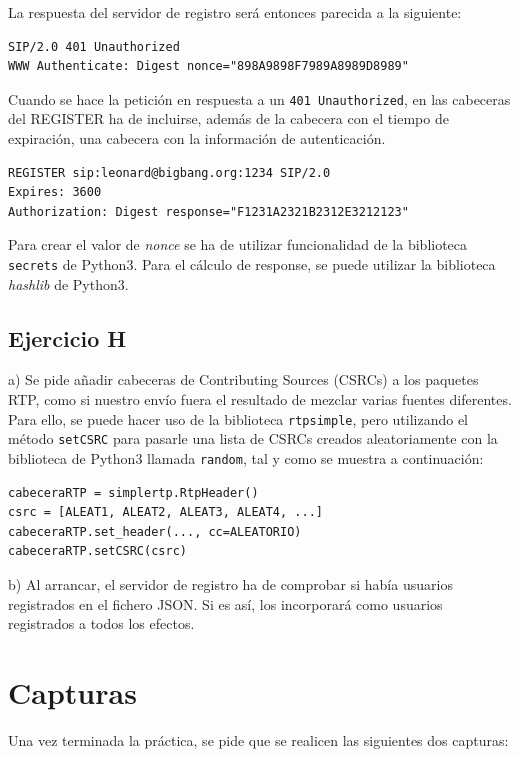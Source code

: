 \documentclass[a4paper,11pt]{article}
\begin{document}
La respuesta del servidor de registro será entonces parecida a la siguiente:
    
\begin{verbatim}
SIP/2.0 401 Unauthorized
WWW Authenticate: Digest nonce="898A9898F7989A8989D8989"
\end{verbatim}

Cuando se hace la petición en respuesta a un \texttt{401 Unauthorized}, en las cabeceras del REGISTER ha de incluirse, además de la cabecera con el tiempo de expiración, una cabecera con la información de autenticación.

\begin{verbatim}
REGISTER sip:leonard@bigbang.org:1234 SIP/2.0
Expires: 3600
Authorization: Digest response="F1231A2321B2312E3212123"
\end{verbatim}

Para crear el valor de \emph{nonce} se ha de utilizar funcionalidad de la biblioteca \texttt{secrets} de Python3. Para el cálculo de response, se puede utilizar la biblioteca \emph{hashlib} de Python3.


\subsection{Ejercicio H}

a) Se pide añadir cabeceras de Contributing Sources (CSRCs) a los paquetes RTP, como si nuestro envío fuera el resultado de mezclar varias fuentes diferentes. Para ello, se puede hacer uso de la biblioteca \texttt{rtpsimple}, pero utilizando el método \texttt{setCSRC} para pasarle una lista de CSRCs creados aleatoriamente con la biblioteca de Python3 llamada \texttt{random}, tal y como se muestra a continuación:

\begin{verbatim}
cabeceraRTP = simplertp.RtpHeader()
csrc = [ALEAT1, ALEAT2, ALEAT3, ALEAT4, ...]
cabeceraRTP.set_header(..., cc=ALEATORIO)
cabeceraRTP.setCSRC(csrc)
\end{verbatim}


b) Al arrancar, el servidor de registro ha de comprobar si había usuarios registrados en el fichero JSON. Si es así, los incorporará como usuarios registrados a todos los efectos.


\section{Capturas}

Una vez terminada la práctica, se pide que se realicen las 
siguientes dos capturas:
\end{document}
